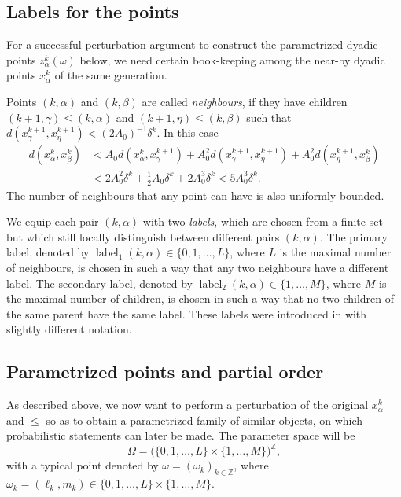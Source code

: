 \documentclass{amsart}
\numberwithin{equation}{section}
\theoremstyle{plain}
\theoremstyle{definition}
\theoremstyle{remark}
\begin{document}
{{\subsection*{Labels for the points}
For a successful perturbation argument to construct the parametrized dyadic points $z^k_\alpha(\omega)$ below, we need certain book-keeping among the near-by dyadic points $x^k_\alpha$ of the same generation.

Points $(k,\alpha)$ and $(k,\beta)$ are called \emph{neighbours}, if they have children $(k+1,\gamma)\leq(k,\alpha)$ and $(k+1,\eta)\leq(k,\beta)$ such that $d(x^{k+1}_{\gamma},x^{k+1}_{\eta})<(2A_0)^{-1}\delta^k$. In this case
\begin{equation*}
\begin{split}
 d(x^k_{\alpha},x^k_{\beta})
 &<A_0 d(x^k_{\alpha},x^{k+1}_{\gamma})
 +A_0^2 d(x^{k+1}_{\gamma},x^{k+1}_{\eta})
 +A_0^2 d(x^{k+1}_{\eta},x^k_{\beta}) \\
 &<2A_0^2\delta^k+\tfrac12 A_0\delta^k+2A_0^3\delta^k<5A_0^3\delta^k.
\end{split}
\end{equation*}
The number of neighbours that any point can have is also uniformly bounded.

We equip each pair $(k,\alpha)$ with two \emph{labels}, which are chosen from a finite set but which still locally distinguish between different pairs $(k,\alpha)$. The primary label, denoted by $\operatorname{label}_1(k,\alpha)\in\{0,1,\ldots,L\}$, where $L$ is the maximal number of neighbours, is chosen in such a way that any two neighbours have a different label. The secondary label, denoted by $\operatorname{label}_2(k,\alpha)\in\{1,\ldots,M\}$, where $M$ is the maximal number of children, is chosen in such a way that no two children of the same parent have the same label. These labels were introduced in \cite{HK} with slightly different notation.

\subsection*{Parametrized points and partial order}
As described above, we now want to perform a perturbation of the original $x^k_\alpha$ and $\leq$ so as to obtain a parametrized family of similar objects, on which probabilistic statements can later be made. The parameter space will be
\begin{equation*}
  \Omega=\Big(\{0,1,\ldots,L\}\times\{1,\ldots,M\}\Big)^{\mathbb{Z}},
\end{equation*}
with a typical point denoted by $\omega=(\omega_k)_{k\in{\mathbb{Z}}}$, where $\omega_k=(\ell_k,m_k)\in\{0,1,\ldots,L\}\times\{1,\ldots,M\}$.

}}
\end{document}
